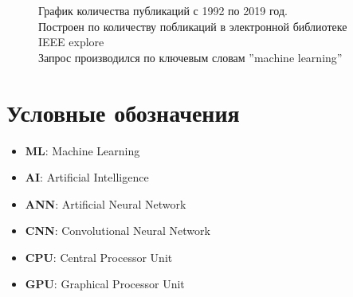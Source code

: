 \documentclass{article}
\begin{document}
    \begin{figure}[h]
        
        \caption{ \centering График количества публикаций с 1992 по 2019 год. \\
        Построен по количеству побликаций в электронной библиотеке IEEE explore \\
        Запрос производился по ключевым словам ''machine learning''}
        \label{fig:stat}
    \end{figure}
    
    \newpage
    
\section*{Условные обозначения}
    \begin{itemize}
    \item \textbf{ML}: Machine Learning
    \item \textbf{AI}: Artificial Intelligence
    \item \textbf{ANN}: Artificial Neural Network
    \item \textbf{CNN}: Convolutional Neural Network
    \item \textbf{CPU}: Central Processor Unit
    \item \textbf{GPU}: Graphical Processor Unit
    
\end{itemize}
\end{document}
